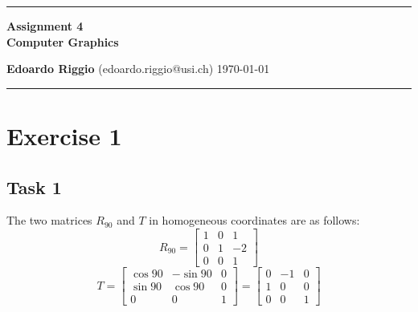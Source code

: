 \documentclass{article}
\begin{document}
\begin{center}
\hrule

\vspace{.4cm}
{\bf {\Huge Assignment 4}} \\
\vspace{.2cm}
{\bf Computer Graphics}
\vspace{.2cm}
\end{center}
{\bf Edoardo Riggio } (edoardo.riggio@usi.ch) \hspace{\fill}  \today \\
\hrule
\vspace{.2cm}

\section{Exercise 1}
\subsection{Task 1}
The two matrices $R_90$ and $T$ in homogeneous coordinates are as follows:
\[ R_{90} = \begin{bmatrix} 1 & 0 & 1 \\ 0 & 1 & -2 \\ 0 & 0 & 1 \end{bmatrix} \]
\[ T = \begin{bmatrix} \cos{90} & -\sin{90} & 0 \\ \sin{90} & \cos{90} & 0 \\ 0 & 0 & 1 \end{bmatrix} = \begin{bmatrix} 0 & -1 & 0 \\ 1 & 0 & 0 \\ 0 & 0 & 1 \end{bmatrix} \]
\end{document}

